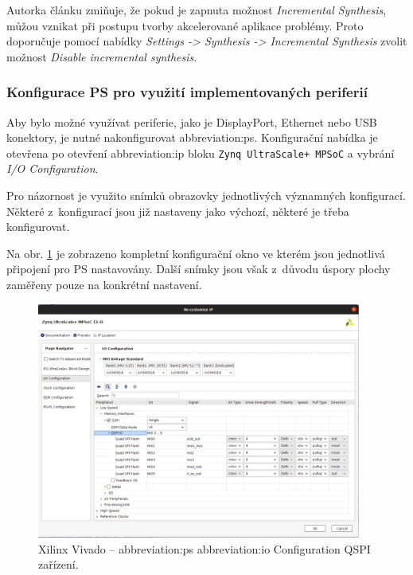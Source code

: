 \documentclass[a4paper, twoside, 11pt]{article}
\begin{document}
				Autorka článku \cite{hackster-getting-started-with-the-kria-kr260-in-vivado} zmiňuje, že pokud je zapnuta možnost \textit{Incremental Synthesis}, můžou vznikat při postupu tvorby akcelerované aplikace problémy. Proto doporučuje pomocí nabídky \textit{Settings -> Synthesis -> Incremental Synthesis} zvolit možnost \textit{Disable incremental synthesis}.\par

				\subsubsection{Konfigurace PS pro využití implementovaných periferií}
				Aby bylo možné využívat periferie, jako je DisplayPort, Ethernet nebo USB konektory, je nutné nakonfigurovat \gls{abbreviation:ps}. Konfigurační nabídka je otevřena po otevření \gls{abbreviation:ip} bloku \texttt{Zynq UltraScale+ MPSoC} a vybrání \textit{I/O Configuration}.\par
				Pro názornost je využito snímků obrazovky jednotlivých významných konfigurací. Některé z~konfigurací jsou již nastaveny jako výchozí, některé je třeba konfigurovat.\par
				Na obr. \ref{fig:kr26-xilix-vivado-flow-17} je zobrazeno kompletní konfigurační okno ve kterém jsou jednotlivá připojení pro PS nastavovány. Další snímky jsou však z~důvodu úspory plochy zaměřeny pouze na konkrétní nastavení.

				\begin{figure}[htbp!]
					\centering
					\includegraphics[width=0.95\textwidth]{src/png/kr26-xilinx-vivado-flow/kr26-xilix-vivado-flow-17.jpg}
					\caption{Xilinx Vivado – \gls{abbreviation:ps} \gls{abbreviation:io} Configuration QSPI zařízení.}
					\label{fig:kr26-xilix-vivado-flow-17}
				\end{figure}
\end{document}
